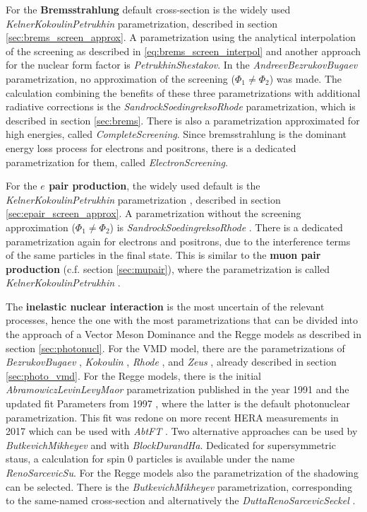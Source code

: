 For the \textbf{Bremsstrahlung} default cross-section is the widely used \textit{KelnerKokoulinPetrukhin} parametrization, described in section \ref{sec:brems_screen_approx}.
A parametrization using the analytical interpolation of the screening as described in \eqref{eq:brems_screen_interpol} and another approach for the nuclear form factor is \textit{PetrukhinShestakov}.
In the \textit{AndreevBezrukovBugaev} parametrization, no approximation of the screening ($\Phi_1 \neq \Phi_2$) was made.
The calculation combining the benefits of these three parametrizations with additional radiative corrections is the \textit{SandrockSoedingreksoRhode} parametrization, which is described in section \ref{sec:brems}.
There is also a parametrization approximated for high energies, called \textit{CompleteScreening}.
Since bremsstrahlung is the dominant energy loss process for electrons and positrons, there is a dedicated parametrization for them, called \textit{ElectronScreening}.

For the \textbf{$e$ pair production}, the widely used default is the \textit{KelnerKokoulinPetrukhin} parametrization \cite{Kokoulin71, Kelner98}, described in section \ref{sec:epair_screen_approx}.
A parametrization without the screening approximation ($\Phi_1 \neq \Phi_2$) is \textit{SandrockSoedingreksoRhode} \cite{Soedingrekso19ICRC}.
There is a dedicated parametrization again for electrons and positrons, due to the interference terms of the same particles in the final state.
This is similar to the \textbf{muon pair production} (c.f. section \ref{sec:mupair}), where the parametrization is called \textit{KelnerKokoulinPetrukhin} \cite{Kelner00mupair}.

The \textbf{inelastic nuclear interaction} is the most uncertain of the relevant processes, hence the one with the most parametrizations that can be divided into the approach of a Vector Meson Dominance and the Regge models as described in section \ref{sec:photonucl}.
For the VMD model, there are the parametrizations of \textit{BezrukovBugaev} \cite{Bezrukov80}, \textit{Kokoulin} \cite{Kokoulin97}, \textit{Rhode} \cite{Rhode93PhD}, and \textit{Zeus} \cite{Breitweg99ZEUS}, already described in section \ref{sec:photo_vmd}.
For the Regge models, there is the initial \textit{AbramowiczLevinLevyMaor} parametrization published in the year 1991 \cite{Abramowicz91} and the updated fit Parameters from 1997 \cite{Abramowicz97}, where the latter is the default photonuclear parametrization.
This fit was redone on more recent HERA measurements in 2017 which can be used with \textit{AbtFT} \cite{Abt17PhotoQ2}.
Two alternative approaches can be used by \textit{ButkevichMikheyev} \cite{Butkevich02} and with \textit{BlockDurandHa}.
Dedicated for supersymmetric staus, a calculation for spin 0 particles is available under the name \textit{RenoSarcevicSu}.
For the Regge models also the parametrization of the shadowing can be selected.
There is the \textit{ButkevichMikheyev} parametrization, corresponding to the same-named cross-section and alternatively the \textit{DuttaRenoSarcevicSeckel} \cite{Dutta01}.

